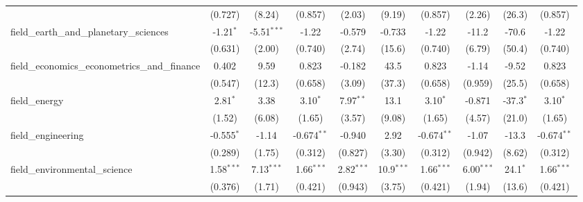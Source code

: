 \begin{tabular}{lccccccccc}
                                                               & (0.727)        & (8.24)         & (0.857)       & (2.03)        & (9.19)         & (0.857)       & (2.26)        & (26.3)        & (0.857)\\   
   field\_earth\_and\_planetary\_sciences                      & -1.21$^{*}$    & -5.51$^{***}$  & -1.22         & -0.579        & -0.733         & -1.22         & -11.2         & -70.6         & -1.22\\   
                                                               & (0.631)        & (2.00)         & (0.740)       & (2.74)        & (15.6)         & (0.740)       & (6.79)        & (50.4)        & (0.740)\\   
   field\_economics\_econometrics\_and\_finance                & 0.402          & 9.59           & 0.823         & -0.182        & 43.5           & 0.823         & -1.14         & -9.52         & 0.823\\   
                                                               & (0.547)        & (12.3)         & (0.658)       & (3.09)        & (37.3)         & (0.658)       & (0.959)       & (25.5)        & (0.658)\\   
   field\_energy                                               & 2.81$^{*}$     & 3.38           & 3.10$^{*}$    & 7.97$^{**}$   & 13.1           & 3.10$^{*}$    & -0.871        & -37.3$^{*}$   & 3.10$^{*}$\\   
                                                               & (1.52)         & (6.08)         & (1.65)        & (3.57)        & (9.08)         & (1.65)        & (4.57)        & (21.0)        & (1.65)\\   
   field\_engineering                                          & -0.555$^{*}$   & -1.14          & -0.674$^{**}$ & -0.940        & 2.92           & -0.674$^{**}$ & -1.07         & -13.3         & -0.674$^{**}$\\   
                                                               & (0.289)        & (1.75)         & (0.312)       & (0.827)       & (3.30)         & (0.312)       & (0.942)       & (8.62)        & (0.312)\\   
   field\_environmental\_science                               & 1.58$^{***}$   & 7.13$^{***}$   & 1.66$^{***}$  & 2.82$^{***}$  & 10.9$^{***}$   & 1.66$^{***}$  & 6.00$^{***}$  & 24.1$^{*}$    & 1.66$^{***}$\\   
                                                               & (0.376)        & (1.71)         & (0.421)       & (0.943)       & (3.75)         & (0.421)       & (1.94)        & (13.6)        & (0.421)\\   

\end{tabular}
